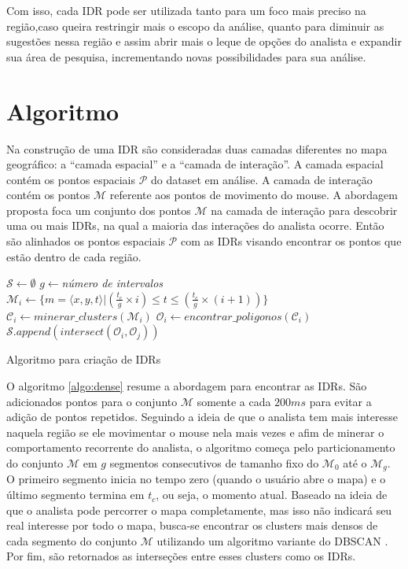 Com isso, cada IDR pode ser utilizada tanto para um foco mais preciso na região,caso queira restringir mais o escopo da análise, quanto para diminuir as sugestões nessa região e assim abrir mais o leque de opções do analista e expandir sua área de pesquisa, incrementando novas possibilidades para sua análise.

\section{Algoritmo}

Na construção de uma IDR são consideradas duas camadas diferentes no mapa geográfico: a ``camada espacial'' e a ``camada de interação''. A camada espacial contém os pontos espaciais $\mathcal{P}$ do dataset em análise. A camada de interação  contém os pontos $\mathcal{M}$ referente aos pontos de movimento do mouse. A abordagem proposta foca um conjunto dos pontos $\mathcal{M}$ na camada de interação para descobrir uma ou mais IDRs, na qual a maioria das interações do analista ocorre. Então são alinhados os pontos espaciais $\mathcal{P}$ com as IDRs visando encontrar os pontos que estão dentro de cada região. 

\begin{algorithm}[!h]
        \DontPrintSemicolon
        $\mathcal{S} \gets \emptyset$\;
        $g \gets ${\em número de intervalos}\;
        {
               $\mathcal{M}_i \gets \{m = \langle x,y,t \rangle | (\frac{t_c}{g} \times i) \leq t \leq (\frac{t_c}{g} \times (i+1))\}$\;
               $\mathcal{C}_i \gets \mathit{minerar\_clusters}(\mathcal{M}_i)$\label{ln:mine}\;
               $\mathcal{O}_i \gets \mathit{encontrar\_poligonos}(\mathcal{C}_i)$\label{ln:poly}\;
        }
        {
            $\mathcal{S}.\mathit{append}(\mathit{intersect}(\mathcal{O}_i, \mathcal{O}_j))$
        }
        \;  
        \caption{Algoritmo para criação de IDRs}
        \label{algo:dense}
\end{algorithm}

O algoritmo \ref{algo:dense} resume a abordagem para encontrar as IDRs. São adicionados pontos para o conjunto $\mathcal{M}$ somente a cada $200ms$ para evitar a adição de pontos repetidos. Seguindo a ideia de que o analista tem mais interesse naquela região se ele movimentar o mouse nela mais vezes e afim de minerar o comportamento recorrente do analista, o algoritmo começa pelo particionamento do conjunto $\mathcal{M}$ em $g$ segmentos consecutivos de tamanho fixo do $\mathcal{M}_0$ até o $\mathcal{M}_g$. O primeiro segmento inicia no tempo zero (quando o usuário abre o mapa) e o último segmento termina em $t_c$, ou seja, o momento atual. Baseado na ideia de que o analista pode percorrer o mapa completamente, mas isso não indicará seu real interesse por todo o mapa, busca-se encontrar os clusters mais densos de cada segmento do conjunto $\mathcal{M}$ utilizando um algoritmo variante do DBSCAN \cite{Ester:1996:DAD:3001460.3001507}. Por fim, são retornados as interseções entre esses clusters como os IDRs.

